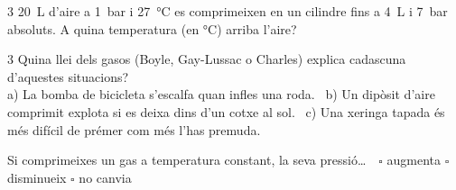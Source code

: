 \begin{exercici}{3}
\SI{20}{\liter} d'aire a \SI{1}{\bar} i \SI{27}{\degreeCelsius} es comprimeixen en un cilindre fins a \SI{4}{\liter} i \SI{7}{\bar} absoluts. A quina temperatura (en \si{\degreeCelsius}) arriba l'aire?
\end{exercici}

\begin{exercici}{3}
Quina llei dels gasos (Boyle, Gay-Lussac o Charles) explica cadascuna d'aquestes situacions?\\
a) La bomba de bicicleta s'escalfa quan infles una roda. \ b) Un dipòsit d'aire comprimit explota si es deixa dins d'un cotxe al sol. \ c) Una xeringa tapada és més difícil de prémer com més l'has premuda.
\end{exercici}

\begin{comprova}
Si comprimeixes un gas a temperatura constant, la seva pressió\ldots\ \ $\square$ augmenta \quad $\square$ disminueix \quad $\square$ no canvia
\end{comprova}
